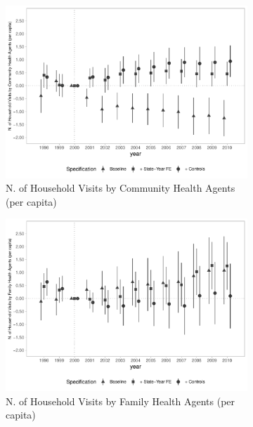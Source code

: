 \begin{figure}[h]
\begin{center}
    \begin{subfigure}{0.32\textwidth}
        \centering
        \caption{\scriptsize N. of Household Visits by Community Health Agents (per capita)}\label{fig:access2_e}
        \includegraphics[width=\textwidth]{plots/access/siab_visit_cha_pacs_pcapita_dist_ec29_baseline_dist_ec29_baseline_full.pdf}
    \end{subfigure}
    \begin{subfigure}{0.32\textwidth}
        \centering
        \caption{\scriptsize N. of Household Visits by Family Health Agents (per capita)}\label{fig:access2_f}
        \includegraphics[width=\textwidth]{plots/access/siab_visit_cha_psf_pcapita_dist_ec29_baseline_dist_ec29_baseline_full.pdf}
    \end{subfigure}
    \begin{subfigure}{0.32\textwidth}

\end{subfigure}
\end{center}
\end{figure}
